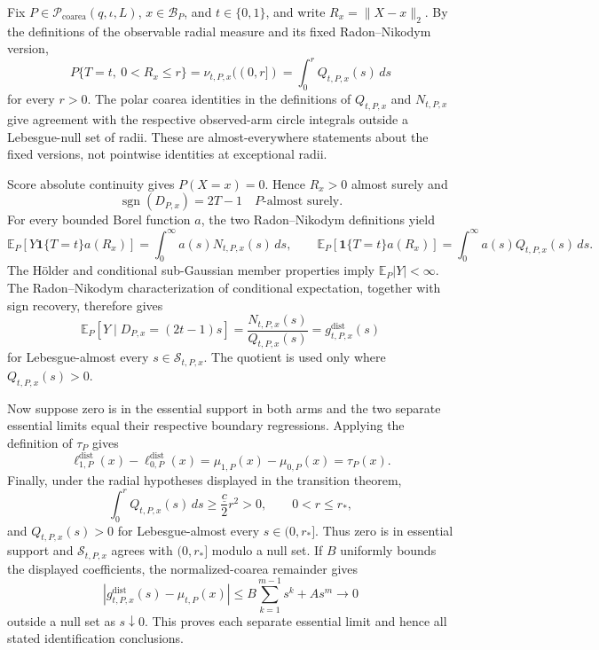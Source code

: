 Fix \(P\in\mathcal P_{\mathrm{coarea}}(q,\iota,L)\), \(x\in\mathcal B_P\), and \(t\in\{0,1\}\), and write \(R_x=\lVert X-x\rVert_2\).  By the definitions of the observable radial measure and its fixed Radon--Nikodym version,
\[
 P\{T=t,\ 0<R_x\leq r\}
 =\nu_{t,P,x}((0,r])
 =\int_0^rQ_{t,P,x}(s)\,ds
\]
for every \(r>0\).  The polar coarea identities in the definitions of \(Q_{t,P,x}\) and \(N_{t,P,x}\) give agreement with the respective observed-arm circle integrals outside a Lebesgue-null set of radii.  These are almost-everywhere statements about the fixed versions, not pointwise identities at exceptional radii.

Score absolute continuity gives \(P(X=x)=0\).  Hence \(R_x>0\) almost surely and
\[
 \operatorname{sgn}(D_{P,x})=2T-1
 \quad P\text{-almost surely}.
\]
For every bounded Borel function \(a\), the two Radon--Nikodym definitions yield
\[
 \mathbb E_P[Y\mathbf1\{T=t\}a(R_x)]
 =\int_0^\infty a(s)N_{t,P,x}(s)\,ds,
 \qquad
 \mathbb E_P[\mathbf1\{T=t\}a(R_x)]
 =\int_0^\infty a(s)Q_{t,P,x}(s)\,ds.
\]
The H\"older and conditional sub-Gaussian member properties imply \(\mathbb E_P|Y|<\infty\).  The Radon--Nikodym characterization of conditional expectation, together with sign recovery, therefore gives
\[
 \mathbb E_P[Y\mid D_{P,x}=(2t-1)s]
 =\frac{N_{t,P,x}(s)}{Q_{t,P,x}(s)}
 =g^{\mathrm{dist}}_{t,P,x}(s)
\]
for Lebesgue-almost every \(s\in\mathcal S_{t,P,x}\).  The quotient is used only where \(Q_{t,P,x}(s)>0\).

Now suppose zero is in the essential support in both arms and the two separate essential limits equal their respective boundary regressions.  Applying the definition of \(\tau_P\) gives
\[
 \ell^{\mathrm{dist}}_{1,P}(x)-\ell^{\mathrm{dist}}_{0,P}(x)
 =\mu_{1,P}(x)-\mu_{0,P}(x)=\tau_P(x).
\]
Finally, under the radial hypotheses displayed in the transition theorem,
\[
 \int_0^rQ_{t,P,x}(s)\,ds\geq\frac{\underline c}{2}r^2>0,
 \qquad 0<r\leq r_*,
\]
and \(Q_{t,P,x}(s)>0\) for Lebesgue-almost every \(s\in(0,r_*]\).  Thus zero is in essential support and \(\mathcal S_{t,P,x}\) agrees with \((0,r_*]\) modulo a null set.  If \(B\) uniformly bounds the displayed coefficients, the normalized-coarea remainder gives
\[
 |g^{\mathrm{dist}}_{t,P,x}(s)-\mu_{t,P}(x)|
 \leq B\sum_{k=1}^{m-1}s^k+As^m\longrightarrow0
\]
outside a null set as \(s\downarrow0\).  This proves each separate essential limit and hence all stated identification conclusions.